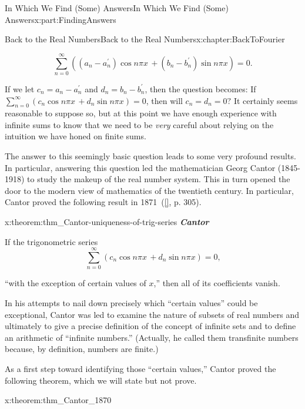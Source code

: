 \documentclass[oneside,10pt,]{book}
\newcommand{\xreffont}{\relax}
\newcommand{\alert}[1]{\textbf{\textit{#1}}}
\numberwithin{equation}{section}
\begin{document}
\begin{partptx}{In Which We Find (Some) Answers}{}{In Which We Find (Some) Answers}{}{}{x:part:FindingAnswers}
\begin{chapterptx}{Back to the Real Numbers}{}{Back to the Real Numbers}{}{}{x:chapter:BackToFourier}
\begin{introduction}{}
\begin{equation*}
\sum_{n=0}^\infty\left((a_n-a^\prime_n)\cos n\pi x\,+(b_n-b^\prime_n)\sin n\pi x\right) = 0\text{.}
\end{equation*}
%
\par
If we let \(c_n = a_n-a^\prime_n\) and \(d_n = b_n-b^\prime_n\), then the question becomes: If \(\sum_{n=0}^\infty\left(c_n\cos n\pi x\,+d_n\sin n\pi x\right) = 0\), then will \(c_n=d_n=0?\) It certainly seems reasonable to suppose so, but at this point we have enough experience with infinite sums to know that we need to be \emph{very} careful about relying on the intuition we have honed on finite sums.%
\par
{} The answer to this seemingly basic question leads to some very profound results.  In particular, answering this question led the mathematician Georg Cantor (1845-1918) to study the makeup of the real number system.  This in turn opened the door to the modern view of mathematics of the twentieth century.  In particular, Cantor proved the following result in 1871~(\hyperlink{x:biblio:jahnke03__histor_analy}{[{\xreffont 6}]}, p. 305).%
\begin{theorem}{}{}{x:theorem:thm_Cantor-uniqueness-of-trig-series}%
\alert{Cantor}%
\par
{} If the trigonometric series%
\begin{equation*}
\sum_{n=0}^\infty\left(c_n\cos n\pi  x\,+d_n\sin n\pi x\right) = 0\text{,}
\end{equation*}
%
\par
``with the exception of certain values of \(x\),'' then all of its coefficients vanish.%
\end{theorem}
In his attempts to nail down precisely which ``certain values'' could be exceptional, Cantor was led to examine the nature of subsets of real numbers and ultimately to give a precise definition of the concept of infinite sets and to define an arithmetic of ``infinite numbers.'' (Actually, he called them \textbraceleft{}transfinite numbers\textbraceright{} because, by definition, numbers are finite.)%
\par
As a first step toward identifying those ``certain values,'' Cantor proved the following theorem, which we will state but not prove.%
\begin{theorem}{}{}{x:theorem:thm_Cantor_1870}%

\end{theorem}
\end{introduction}
\end{chapterptx}
\end{partptx}
\end{document}
